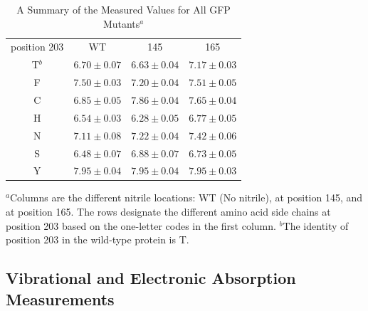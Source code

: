 \begin{table}
    \caption[Experimental \pKa{} values of the GFP chromophore]{
        A Summary of the Measured \pKa{} Values for All GFP Mutants$^a$
    }
    \begin{center}
    \begin{tabular}{c|ccc}
        \toprule
        \rowcolor{lgray}
        position 203 & WT & \pCNF{} 145 & \pCNF{} 165 \\

        \cmidrule(r){1-1}\cmidrule(l){2-4}
        T$^b$ &   $ 6.70 \pm 0.07 $  &  $ 6.63 \pm 0.04 $ &  $ 7.17 \pm 0.03 $  \\
        F     &   $ 7.50 \pm 0.03 $  &  $ 7.20 \pm 0.04 $ &  $ 7.51 \pm 0.05 $  \\
        C     &   $ 6.85 \pm 0.05 $  &  $ 7.86 \pm 0.04 $ &  $ 7.65 \pm 0.04 $  \\
        H     &   $ 6.54 \pm 0.03 $  &  $ 6.28 \pm 0.05 $ &  $ 6.77 \pm 0.05 $  \\ 
        N     &   $ 7.11 \pm 0.08 $  &  $ 7.22 \pm 0.04 $ &  $ 7.42 \pm 0.06 $  \\ 
        S     &   $ 6.48 \pm 0.07 $  &  $ 6.88 \pm 0.07 $ &  $ 6.73 \pm 0.05 $  \\ 
        Y     &   $ 7.95 \pm 0.04 $  &  $ 7.95 \pm 0.04 $ &  $ 7.95 \pm 0.03 $  \\ 

        \bottomrule
    \end{tabular}
    \end{center}

    $^a$Columns are the different nitrile locations: WT (No nitrile), \pCNF{} at position 145, and \pCNF{} at position 165. The rows designate the different amino acid side chains at position 203 based on the one-letter codes in the first column. 
    $^b$The identity of position 203 in the wild-type protein is T.
    \label{tbl:pKas}
\end{table}

\subsection{Vibrational and Electronic Absorption Measurements}

